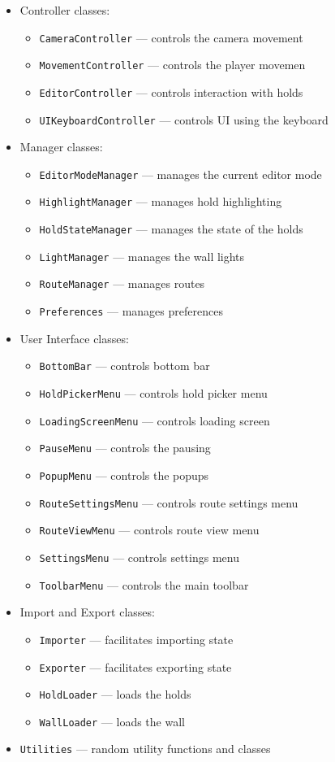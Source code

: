 \begin{itemize}
	\item Controller classes:
	\begin{itemize}
		\item \verb|CameraController| --- controls the camera movement
		\item \verb|MovementController| --- controls the player movemen
		\item \verb|EditorController| --- controls interaction with holds
		\item \verb|UIKeyboardController| --- controls UI using the keyboard
	\end{itemize}
	\item Manager classes:
	\begin{itemize}
		\item \verb|EditorModeManager| --- manages the current editor mode
		\item \verb|HighlightManager| --- manages hold highlighting
		\item \verb|HoldStateManager| --- manages the state of the holds
		\item \verb|LightManager| --- manages the wall lights
		\item \verb|RouteManager| --- manages routes
		\item \verb|Preferences| --- manages preferences
	\end{itemize}
	\item User Interface classes:
	\begin{itemize}
		\item \verb|BottomBar| --- controls bottom bar
		\item \verb|HoldPickerMenu| --- controls hold picker menu
		\item \verb|LoadingScreenMenu| --- controls loading screen
		\item \verb|PauseMenu| --- controls the pausing
		\item \verb|PopupMenu| --- controls the popups
		\item \verb|RouteSettingsMenu| --- controls route settings menu
		\item \verb|RouteViewMenu| --- controls route view menu
		\item \verb|SettingsMenu| --- controls settings menu
		\item \verb|ToolbarMenu| --- controls the main toolbar
	\end{itemize}
	\item Import and Export classes:
	\begin{itemize}
		\item \verb|Importer| --- facilitates importing state
		\item \verb|Exporter| --- facilitates exporting state
		\item \verb|HoldLoader| --- loads the holds
		\item \verb|WallLoader| --- loads the wall
	\end{itemize}
	\item \verb|Utilities| --- random utility functions and classes
\end{itemize}

